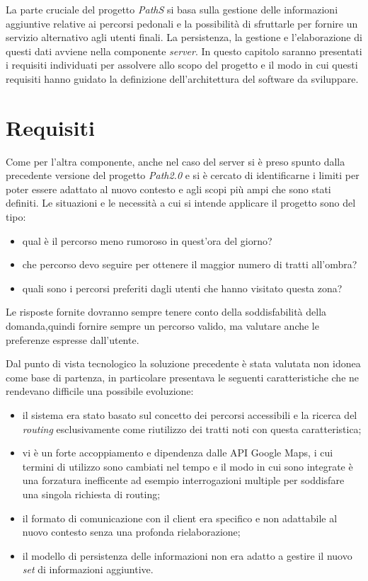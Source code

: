 La parte cruciale del progetto \emph{PathS} si basa sulla gestione delle informazioni aggiuntive relative ai percorsi pedonali e la possibilità di sfruttarle per fornire un servizio alternativo agli utenti finali. La persistenza, la gestione e l'elaborazione di questi dati avviene nella componente \emph{server}. 
In questo capitolo saranno presentati i requisiti individuati per assolvere allo scopo del progetto e il modo in cui questi requisiti hanno guidato la definizione dell'architettura del software da sviluppare.

\section{Requisiti}
Come per l'altra componente, anche nel caso del server si è preso spunto dalla precedente versione del progetto \emph{Path2.0} e si è cercato di identificarne i limiti per poter essere adattato al nuovo contesto e agli scopi più ampi che sono stati definiti. Le situazioni e le necessità a cui si intende applicare il progetto sono del tipo:
\begin{itemize}
\item qual è il percorso meno rumoroso in quest’ora del giorno?
\item che percorso devo seguire per ottenere il maggior numero di tratti all’ombra?
\item quali sono i percorsi preferiti dagli utenti che hanno visitato questa zona?
\end{itemize}
Le risposte fornite dovranno sempre tenere conto della soddisfabilità della domanda,quindi fornire sempre un percorso valido, ma valutare anche le preferenze espresse dall’utente.

Dal punto di vista tecnologico la soluzione precedente è stata valutata non idonea come base di partenza, in particolare presentava le seguenti caratteristiche che ne rendevano difficile una possibile evoluzione:
\begin{itemize}
\item il sistema era stato basato sul concetto dei percorsi accessibili e la ricerca del \emph{routing} esclusivamente come riutilizzo dei tratti noti con questa caratteristica;
\item vi è un forte accoppiamento e dipendenza dalle API Google Maps, i cui termini di utilizzo sono cambiati nel tempo e il modo in cui sono integrate è una forzatura inefficente ad esempio interrogazioni multiple per soddisfare una singola richiesta di routing;
\item il formato di comunicazione con il client era specifico e non adattabile al nuovo contesto senza una profonda rielaborazione;
\item il modello di persistenza delle informazioni non era adatto a gestire il nuovo \emph{set} di informazioni aggiuntive.
\end{itemize}


